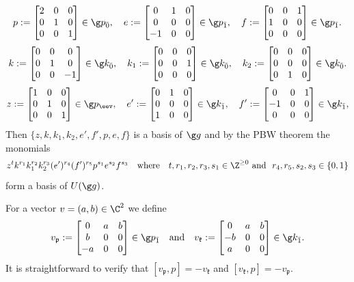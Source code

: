 \documentclass[11pt]{amsart}
\begin{document}
\[
p:=\begin{bmatrix}
2&0&0\\
0&1&0\\
0&0&1
\end{bmatrix}\in \g p_{\bar{0}},\quad e:=\begin{bmatrix}
0&1&0\\
0&0&0\\
-1&0&0
\end{bmatrix}\in \g p_{\bar{1}},\quad f:=\begin{bmatrix}
0&0&1\\
1&0&0\\
0&0&0
\end{bmatrix}\in \g p_{\bar{1}}.
\]
\[k:=\begin{bmatrix}
0&0&0\\
0&1&0\\
0&0&-1
\end{bmatrix}\in \g k_{\bar{0}},\quad
k_1:=\begin{bmatrix}
0&0&0\\
0&0&1\\
0&0&0
\end{bmatrix}\in \g k_{\bar{0}},\quad k_2:=\begin{bmatrix}
0&0&0\\
0&0&0\\
0&1&0
\end{bmatrix}\in \g k_{\bar{0}}.
\]
\[
z:=
\begin{bmatrix}
1&0&0\\
0&1&0\\
0&0&1
\end{bmatrix}\in\g p_\eev,
\quad e':=\begin{bmatrix}
0&1&0\\
0&0&0\\
1&0&0
\end{bmatrix}\in \g k_{\bar{1}},\quad f':=\begin{bmatrix}
0&0&1\\
-1&0&0\\
0&0&0
\end{bmatrix}\in \g k_{\bar{1}},
\]
Then $\{z,k,k_1,k_2,e',f',p,e,f\}$ is  a basis of $\g g$ and by the  PBW theorem the monomials 
\[z^tk^{r_1}k_1^{r_2}k_2^{r_3}(e')^{r_4}(f')^{r_5}p^{s_1}e^{s_2}f^{s_3}\quad\text{where}
\quad
t,r_1,r_2,r_3,s_1\in\Z^{\geq 0}\text{ and }\ 
r_4,r_5,s_2,s_3\in\{0,1\}
\]
form a basis of $U(\g g)$.  

For a vector $v=(a,b)\in\C^2$ we define
\[
v_{\mathfrak p}:=\begin{bmatrix}
0&a&b\\
b&0&0\\
-a&0&0
\end{bmatrix}\in \g p_{\bar{1}}\quad\text{and}\quad v_{\mathfrak k}:=\begin{bmatrix}
0&a&b\\
-b&0&0\\
a&0&0
\end{bmatrix}\in \g k_{\bar{1}}.
\]
It is straightforward to verify that  $[v_{\mathfrak p},p]=-v_{\mathfrak k}$ and $[v_{\mathfrak k},p]=-v_{\mathfrak p}$. 
\end{document}
